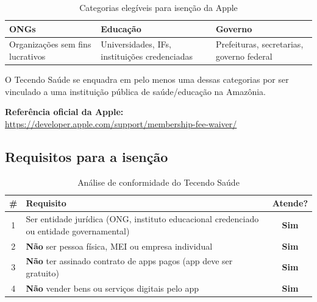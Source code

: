 \documentclass[12pt, a4paper]{article}
\begin{document}
\begin{table}[H]
\centering
\renewcommand{\arraystretch}{1.8}
\begin{tabularx}{\textwidth}{|>{\centering\arraybackslash}X|>{\centering\arraybackslash}X|>{\centering\arraybackslash}X|}
\hline
\rowcolor{verdeC}
\textbf{\color{verde}\large ONGs} & \textbf{\color{azul}\large Educa\c{c}\~ao} & \textbf{\color{dourado}\large Governo} \\
\hline
Organiza\c{c}\~oes sem fins lucrativos & Universidades, IFs, institui\c{c}\~oes credenciadas & Prefeituras, secretarias, governo federal \\
\hline
\end{tabularx}
\caption{Categorias eleg\'iveis para isen\c{c}\~ao da Apple}
\end{table}

O Tecendo Sa\'ude se enquadra em pelo menos uma dessas categorias por ser vinculado a uma institui\c{c}\~ao p\'ublica de sa\'ude/educa\c{c}\~ao na Amaz\^onia.

\begin{caixanota}
  \textbf{Refer\^encia oficial da Apple:} \url{https://developer.apple.com/support/membership-fee-waiver/}
\end{caixanota}

\subsection{Requisitos para a isen\c{c}\~ao}

\begin{table}[H]
\centering
\renewcommand{\arraystretch}{1.5}
\begin{tabularx}{\textwidth}{|c|X|c|}
\hline
\rowcolor{verdeE}
\textbf{\color{white}\#} & \textbf{\color{white}Requisito} & \textbf{\color{white}Atende?} \\
\hline
1 & Ser entidade jur\'idica (ONG, instituto educacional credenciado ou entidade governamental) & \color{verde}\textbf{Sim} \\
\hline
\rowcolor{cinzaC}
2 & \textbf{N\~ao} ser pessoa f\'isica, MEI ou empresa individual & \color{verde}\textbf{Sim} \\
\hline
3 & \textbf{N\~ao} ter assinado contrato de apps pagos (app deve ser gratuito) & \color{verde}\textbf{Sim} \\
\hline
\rowcolor{cinzaC}
4 & \textbf{N\~ao} vender bens ou servi\c{c}os digitais pelo app & \color{verde}\textbf{Sim} \\
\hline
\end{tabularx}
\caption{An\'alise de conformidade do Tecendo Sa\'ude}
\end{table}
\end{document}
